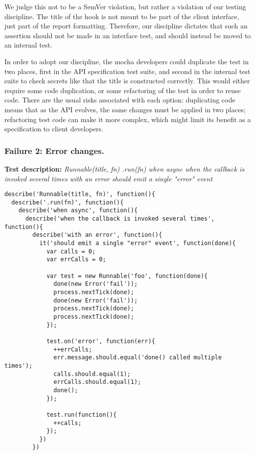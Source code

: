 We judge this not to be a SemVer violation, but rather a violation of
our testing discipline. The title of the hook is not meant to be part
of the client interface, just part of the report
formatting. Therefore, our discipline dictates that such an assertion
should not be made in an interface test, and should instead be moved
to an internal test.

In order to adopt our discipline, the mocha developers could duplicate
the test in two places, first in the API specification test suite, and
second in the internal test suite to check secrets like that the title
is constructed correctly. This would either require some code
duplication, or some refactoring of the test in order to reuse
code. There are the usual risks associated with each option:
duplicating code means that as the API evolves, the same changes must
be applied in two places; refactoring test code can make it more
complex, which might limit its benefit as a specification to client
developers.

\subsubsection{Failure 2: Error changes.}
\label{sec:failure2}
{\bf Test description: }
%
{\em Runnable(title, fn) .run(fn) when async when the callback is
  invoked several times with an error should emit a single "error"
  event }

\begin{figure*}
\begin{lstlisting}
describe('Runnable(title, fn)', function(){
  describe('.run(fn)', function(){
    describe('when async', function(){
      describe('when the callback is invoked several times', function(){
        describe('with an error', function(){
          it('should emit a single "error" event', function(done){
            var calls = 0;
            var errCalls = 0;

            var test = new Runnable('foo', function(done){
              done(new Error('fail'));
              process.nextTick(done);
              done(new Error('fail'));
              process.nextTick(done);
              process.nextTick(done);
            });

            test.on('error', function(err){
              ++errCalls;
              err.message.should.equal('done() called multiple times');
              calls.should.equal(1);
              errCalls.should.equal(1);
              done();
            });

            test.run(function(){
              ++calls;
            });
          })
        })
\end{lstlisting}
\caption{A failing mocha jsapi test}
\label{fig:failing-test}
\end{figure*}

